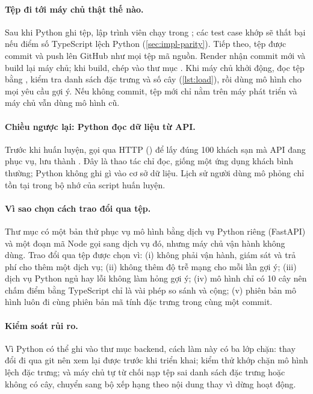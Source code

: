 \paragraph{Tệp đi tới máy chủ thật thế nào.} Sau khi Python ghi tệp, lập trình viên chạy  trong ; các test case khớp sẽ thất bại nếu điểm số TypeScript lệch Python (\cref{sec:impl-parity}). Tiếp theo, tệp được commit và push lên GitHub như mọi tệp mã nguồn. Render nhận commit mới và build lại máy chủ; khi build,  chép  vào thư mục . Khi máy chủ khởi động,  đọc tệp bằng , kiểm tra danh sách đặc trưng và số cây (\cref{lst:load}), rồi dùng mô hình cho mọi yêu cầu gợi ý. Nếu không commit, tệp mới chỉ nằm trên máy phát triển và máy chủ vẫn dùng mô hình cũ.

\paragraph{Chiều ngược lại: Python đọc dữ liệu từ API.} Trước khi huấn luyện,  gọi  qua HTTP () để lấy đúng 100 khách sạn mà API đang phục vụ, lưu thành . Đây là thao tác chỉ đọc, giống một ứng dụng khách bình thường; Python không ghi gì vào cơ sở dữ liệu. Lịch sử người dùng mô phỏng chỉ tồn tại trong bộ nhớ của script huấn luyện.

\paragraph{Vì sao chọn cách trao đổi qua tệp.} Thư mục  có một bản thử phục vụ mô hình bằng dịch vụ Python riêng (FastAPI) và một đoạn mã Node gọi sang dịch vụ đó, nhưng máy chủ vận hành không dùng. Trao đổi qua tệp được chọn vì: (i) không phải vận hành, giám sát và trả phí cho thêm một dịch vụ; (ii) không thêm độ trễ mạng cho mỗi lần gợi ý; (iii) dịch vụ Python ngủ hay lỗi không làm hỏng gợi ý; (iv) mô hình chỉ có 10 cây nên chấm điểm bằng TypeScript chỉ là vài phép so sánh và cộng; (v) phiên bản mô hình luôn đi cùng phiên bản mã tính đặc trưng trong cùng một commit.

\paragraph{Kiểm soát rủi ro.} Vì Python có thể ghi vào thư mục backend, cách làm này có ba lớp chặn: thay đổi đi qua git nên xem lại được trước khi triển khai; kiểm thử khớp chặn mô hình lệch đặc trưng; và máy chủ tự từ chối nạp tệp sai danh sách đặc trưng hoặc không có cây, chuyển sang bộ xếp hạng theo nội dung thay vì dừng hoạt động.

